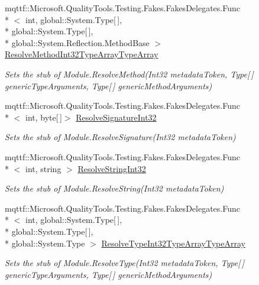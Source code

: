 \begin{DoxyCompactItemize}
mqttf\-::\-Microsoft.\-Quality\-Tools.\-Testing.\-Fakes.\-Fakes\-Delegates.\-Func\\*
$<$ int, global\-::\-System.\-Type\mbox{[}$\,$\mbox{]}, \\*
global\-::\-System.\-Type\mbox{[}$\,$\mbox{]}, \\*
global\-::\-System.\-Reflection.\-Method\-Base $>$ \hyperlink{class_system_1_1_reflection_1_1_fakes_1_1_stub_module_a2614249c9fcce245dd9805fcc5d6c2fb}{Resolve\-Method\-Int32\-Type\-Array\-Type\-Array}
\begin{DoxyCompactList}\small\item\em Sets the stub of Module.\-Resolve\-Method(\-Int32 metadata\-Token, Type\mbox{[}$\,$\mbox{]} generic\-Type\-Arguments, Type\mbox{[}$\,$\mbox{]} generic\-Method\-Arguments)\end{DoxyCompactList}\item 
mqttf\-::\-Microsoft.\-Quality\-Tools.\-Testing.\-Fakes.\-Fakes\-Delegates.\-Func\\*
$<$ int, byte\mbox{[}$\,$\mbox{]}$>$ \hyperlink{class_system_1_1_reflection_1_1_fakes_1_1_stub_module_af373e036405d13f63ba3dc38aeab647b}{Resolve\-Signature\-Int32}
\begin{DoxyCompactList}\small\item\em Sets the stub of Module.\-Resolve\-Signature(\-Int32 metadata\-Token)\end{DoxyCompactList}\item 
mqttf\-::\-Microsoft.\-Quality\-Tools.\-Testing.\-Fakes.\-Fakes\-Delegates.\-Func\\*
$<$ int, string $>$ \hyperlink{class_system_1_1_reflection_1_1_fakes_1_1_stub_module_a7576ee63c7c8c2e5d0babc869d01547f}{Resolve\-String\-Int32}
\begin{DoxyCompactList}\small\item\em Sets the stub of Module.\-Resolve\-String(\-Int32 metadata\-Token)\end{DoxyCompactList}\item 
mqttf\-::\-Microsoft.\-Quality\-Tools.\-Testing.\-Fakes.\-Fakes\-Delegates.\-Func\\*
$<$ int, global\-::\-System.\-Type\mbox{[}$\,$\mbox{]}, \\*
global\-::\-System.\-Type\mbox{[}$\,$\mbox{]}, \\*
global\-::\-System.\-Type $>$ \hyperlink{class_system_1_1_reflection_1_1_fakes_1_1_stub_module_a56c25531d3068b2e4d8709531fd6e58e}{Resolve\-Type\-Int32\-Type\-Array\-Type\-Array}
\begin{DoxyCompactList}\small\item\em Sets the stub of Module.\-Resolve\-Type(\-Int32 metadata\-Token, Type\mbox{[}$\,$\mbox{]} generic\-Type\-Arguments, Type\mbox{[}$\,$\mbox{]} generic\-Method\-Arguments)\end{DoxyCompactList}\item 

\end{DoxyCompactItemize}
